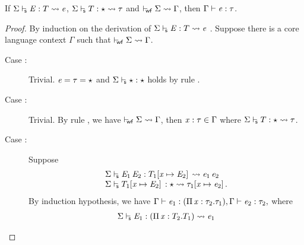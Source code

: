 \begin{thm}
If $ \Sigma  \vdash_{\!\!\mathsf{s} }  \mathit{E}  :  T   \rightsquigarrow   \mathit{e} $, $ \Sigma  \vdash_{\!\!\mathsf{s} }  T  :  \star   \rightsquigarrow   \tau $ and $ \vdash_{\!\!\mathsf{wf} }  \Sigma   \rightsquigarrow   \Gamma $, then
$\Gamma  \vdash  \mathit{e}  :  \tau$.
\end{thm}

\begin{proof}
    By induction on the derivation of $ \Sigma  \vdash_{\!\!\mathsf{s} }  \mathit{E}  :  T   \rightsquigarrow   \mathit{e} $ . Suppose there is
a core language context $\Gamma$ such that $ \vdash_{\!\!\mathsf{wf} }  \Sigma   \rightsquigarrow   \Gamma $.
    \begin{description}
        \item[Case :] Trivial. $\mathit{e} = \tau = \star$ and
$ \Sigma  \vdash_{\!\!\mathsf{s} }  \star  :  \star $ holds by rule .
        \item[Case :] Trivial. By rule , we
have $ \vdash_{\!\!\mathsf{wf} }  \Sigma   \rightsquigarrow   \Gamma $, then $\mathit{x}:\tau  \in  \Gamma$ where $ \Sigma  \vdash_{\!\!\mathsf{s} }  T  :  \star   \rightsquigarrow   \tau $.
        \item[Case :] Suppose
            \[\begin{array}{l}
             \Sigma  \vdash_{\!\!\mathsf{s} }  \mathit{E_{{\mathrm{1}}}} \, \mathit{E_{{\mathrm{2}}}}  :  T_{{\mathrm{1}}}  [  \mathit{x}  \mapsto  \mathit{E_{{\mathrm{2}}}}  ] \,   \rightsquigarrow   \mathit{e_{{\mathrm{1}}}} \, \mathit{e_{{\mathrm{2}}}}  \\
             \Sigma  \vdash_{\!\!\mathsf{s} }  T_{{\mathrm{1}}}  [  \mathit{x}  \mapsto  \mathit{E_{{\mathrm{2}}}}  ] \,  :  \star   \rightsquigarrow   \tau_{{\mathrm{1}}}  [  \mathit{x}  \mapsto  \mathit{e_{{\mathrm{2}}}}  ] \, .
            \end{array} \]
            By induction
            hypothesis, we have 
            $
            \Gamma  \vdash  \mathit{e_{{\mathrm{1}}}}  :  (  \Pi \, \mathit{x}  :  \tau_{{\mathrm{2}}}  .  \tau_{{\mathrm{1}}}  ),
            \Gamma  \vdash  \mathit{e_{{\mathrm{2}}}}  :  \tau_{{\mathrm{2}}},
            $
            where
            \[\begin{array}{l}
              \Sigma  \vdash_{\!\!\mathsf{s} }  \mathit{E_{{\mathrm{1}}}}  :  (  \Pi \, \mathit{x}  :  T_{{\mathrm{2}}}  .  T_{{\mathrm{1}}}  )   \rightsquigarrow   \mathit{e_{{\mathrm{1}}}}  \\

\end{array}\]
\end{description}
\end{proof}
